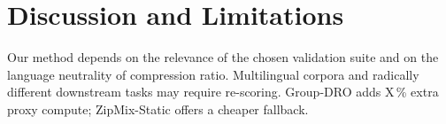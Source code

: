 \section{Discussion and Limitations}\label{sec:discussion}
Our method depends on the relevance of the chosen validation suite and on the language neutrality of compression ratio.
Multilingual corpora and radically different downstream tasks may require re-scoring.
Group-DRO adds X\,\% extra proxy compute; ZipMix-Static offers a cheaper fallback.

